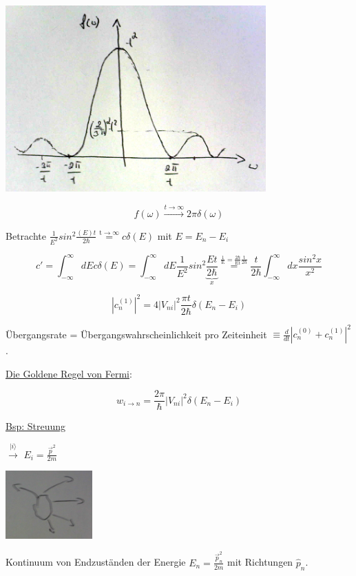 \includegraphics[width=0.75\textwidth]{kap03_07.png}



 \[f(\omega) \xrightarrow{t\rightarrow \infty} 2\pi\delta(\omega)\]



Betrachte \(\frac{1}{E^2}sin^2 \frac{(E)t}{2\hbar} \stackrel{\mathrm{t\rightarrow \infty}}= c\delta(E)\) mit \(E = E_n-E_i\)

\[ c' = \int_{-\infty}^{\infty} dE c\delta(E) = \int_{-\infty}^{\infty} dE \frac{1}{E^2}sin^2\frac{Et}{\underbrace{2\hbar}_{x}} \stackrel{\mathrm{\frac{1}{E}=\frac{2\hbar}{Et}\frac{t}{2\hbar} }}= \frac{t}{2\hbar} \int_{-\infty}^{\infty} dx \frac{sin^2 x}{x^2} \]

\[ |c^{(1)}_n|^2 = 4|V_{ni}|^2 \frac{\pi t}{2\hbar} \delta(E_n-E_i) \]

Übergangsrate = Übergangswahrscheinlichkeit pro Zeiteinheit \(\equiv \frac{d}{dt}|c^{(0)}_n+c^{(1)}_n|^2\) . 

\underline{Die Goldene Regel von Fermi}:

\[\boxed{w_{i\rightarrow n} = \frac{2\pi}{\hbar} |V_{ni}|^2 \delta(E_n-E_i)}\]


\underline{Bsp: Streuung}

\(\xrightarrow{|i\rangle }\) \(E_i = \frac{\vec p^2}{2m}\)

\includegraphics[width=0.25\textwidth]{kap03_08.png}

Kontinuum von Endzuständen der Energie \(E_n = \frac{\vec p^2_n}{2m}\) mit Richtungen \(\hat p_n\).

